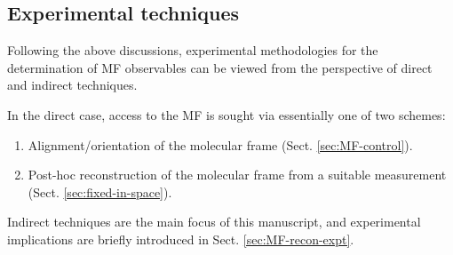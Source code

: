 \documentclass[10pt]{article}
\begin{document}



\subsection{Experimental techniques\label{sec:experimentalTechniques}}

Following the above discussions, experimental methodologies for the determination of MF observables can be viewed from the perspective of direct and indirect techniques. 

In the direct case, access to the MF is sought via essentially one of two schemes:

\begin{enumerate}
\item Alignment/orientation of the molecular frame (Sect. \ref{sec:MF-control}).
\item Post-hoc reconstruction of the molecular frame from a suitable measurement (Sect. \ref{sec:fixed-in-space}).
\end{enumerate}

Indirect techniques are the main focus of this manuscript, and experimental implications are briefly introduced in Sect. \ref{sec:MF-recon-expt}.


\end{document}
